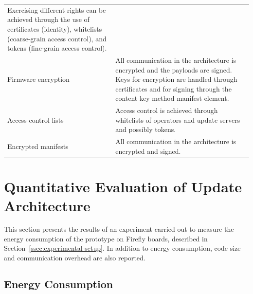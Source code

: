 \documentclass[0-thesis.tex]{subfiles}
\begin{document}
\begin{small}
\begin{longtable}[]{@{}ll@{}}
\begin{minipage}[t]{0.57\columnwidth}
    Exercising different rights can be achieved through the use of
    certificates (identity), whitelists (coarse-grain access control), and
    tokens (fine-grain access control).\strut
    \end{minipage}\tabularnewline
    \begin{minipage}[t]{0.37\columnwidth}\raggedright\strut
    Firmware encryption\strut
    \end{minipage} & \begin{minipage}[t]{0.57\columnwidth}\raggedright\strut
    All communication in the architecture is encrypted and the payloads are
    signed. Keys for encryption are handled through certificates and for
    signing through the content key method manifest element.\strut
    \end{minipage}\tabularnewline
    \begin{minipage}[t]{0.37\columnwidth}\raggedright\strut
    Access control lists\strut
    \end{minipage} & \begin{minipage}[t]{0.57\columnwidth}\raggedright\strut
    Access control is achieved through whitelists of operators and update
    servers and possibly tokens.\strut
    \end{minipage}\tabularnewline
    \begin{minipage}[t]{0.37\columnwidth}\raggedright\strut
    Encrypted manifests\strut
    \end{minipage} & \begin{minipage}[t]{0.57\columnwidth}\raggedright\strut
    All communication in the architecture is encrypted and signed.\strut
    \end{minipage}\tabularnewline
    \bottomrule
\end{longtable}
\end{small}

\section{Quantitative Evaluation of Update Architecture}
\label{sec:quant-evaluation}
This section presents the results of an experiment carried out to measure the energy
consumption of the prototype on Firefly boards, described in
Section~\ref{ssec:experimental-setup}. In addition to energy consumption, code size and
communication overhead are also reported. 

\subsection{Energy Consumption}
\label{ssec:energy-consumption}
\end{document}

